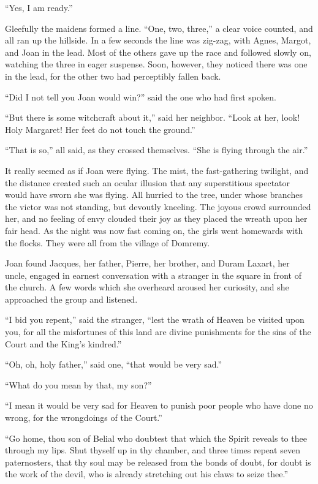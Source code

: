 ``Yes, I am ready.''

Gleefully the maidens formed a line. ``One, two, three,'' a clear voice
counted, and all ran up the hillside. In a few seconds the line was
zig-zag, with Agnes, Margot, and Joan in the lead. Most of the others
gave up the race and followed slowly on, watching the three in eager
suspense. Soon, however, they noticed there was one in the lead, for the
other two had perceptibly fallen back.

``Did I not tell you Joan would win?'' said the one who had first
spoken.

``But there is some witchcraft about it,'' said her neighbor. ``Look at
her, look! Holy Margaret! Her feet do not touch the ground.''

``That is so,'' all said, as they crossed themselves. ``She is flying
through the air.''

It really seemed as if Joan were flying. The mist, the fast-gathering
twilight, and the distance created such an ocular illusion that any
superstitious spectator would have sworn she was flying. All hurried to
the tree, under whose branches the victor was not standing, but devoutly
kneeling. The joyous crowd surrounded her, and no feeling of envy
clouded their joy as they placed the wreath upon her fair head. As the
night was now fast coming on, the girls went homewards with the flocks.
They were all from the village of Domremy.

Joan found Jacques, her father, Pierre, her brother, and Duram Laxart,
her uncle, engaged in earnest conversation with a stranger in the square
in front of the church. A few words which she overheard aroused her
curiosity, and she approached the group and listened.

``I bid you repent,'' said the stranger, ``lest the wrath of Heaven be
visited upon you, for all the misfortunes of this land are divine
punishments for the sins of the Court and the King's kindred.''

``Oh, oh, holy father,'' said one, ``that would be very sad.''

``What do you mean by that, my son?''

``I mean it would be very sad for Heaven to punish poor people who have
done no wrong, for the wrongdoings of the Court.''

``Go home, thou son of Belial who doubtest that which the Spirit reveals
to thee through my lips. Shut thyself up in thy chamber, and three times
repeat seven paternosters, that thy soul may be released from the bonds
of doubt, for doubt is the work of the devil, who is already stretching
out his claws to seize thee.''

